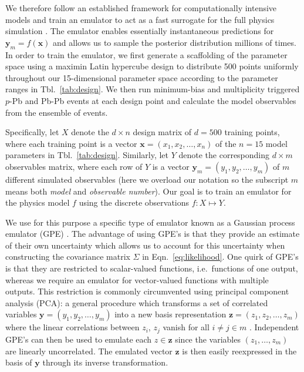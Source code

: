 \documentclass[aps,prc,reprint,amsmath,nofootinbib]{revtex4-1}
\newcommand{\x}{\mathbf x}
\newcommand{\y}{\mathbf y}
\newcommand{\z}{\mathbf z}
\begin{document}
We therefore follow an established framework for computationally intensive models and train an emulator to act as a fast surrogate for the full physics simulation \cite{OHagan:2006ba, Higdon:2008cmc, Higdon:2014tva}.
The emulator enables essentially instantaneous predictions for $\y_m = f(\x)$ and allows us to sample the posterior distribution millions of times.
In order to train the emulator, we first generate a scaffolding of the parameter space using a maximin Latin hypercube design \cite{Morris:1995lh} to distribute 500 points uniformly throughout our 15-dimensional parameter space according to the parameter ranges in Tbl.~\ref{tab:design}.
We then run minimum-bias and multiplicity triggered $p$-Pb and Pb-Pb events at each design point and calculate the model observables from the ensemble of events.

Specifically, let $X$ denote the ${d \times n}$ design matrix of $d=500$ training points, where each training point is a vector $\x = (x_1, x_2, \dots, x_n)$ of the $n=15$ model parameters in Tbl.~\ref{tab:design}.
Similarly, let $Y$ denote the corresponding ${d \times m}$ observables matrix, where each row of $Y$ is a vector $\y_m = (y_1, y_2, \dots, y_m)$ of $m$ different simulated observables (here we overload our notation so the subscript $m$ means both \emph{model} and \emph{observable number}).
Our goal is to train an emulator for the physics model $f$ using the discrete observations $f: X \mapsto Y$.

We use for this purpose a specific type of emulator known as a Gaussian process emulator (GPE) \cite{Rasmussen:2006gp}.
The advantage of using GPE's is that they provide an estimate of their own uncertainty which allows us to account for this uncertainty when constructing the covariance matrix $\Sigma$ in Eqn.~\eqref{eq:likelihood}.
One quirk of GPE's is that they are restricted to scalar-valued functions, i.e.\ functions of one output, whereas we require an emulator for vector-valued functions with multiple outputs.
This restriction is commonly circumvented using principal component analysis (PCA): a general procedure which transforms a set of correlated variables $\y = (y_1, y_2, \dots, y_m)$ into a new basis representation $\z = (z_1, z_2, \dots, z_m)$ where the linear correlations between $z_i$, $z_j$ vanish for all $i\ne j \in m$ \cite{Tipping:1999}.
Independent GPE's can then be used to emulate each $z \in \z$ since the variables $(z_1, \dots, z_m)$ are linearly uncorrelated.
The emulated vector $\z$ is then easily reexpressed in the basis of $\y$ through its inverse transformation.
\end{document}
